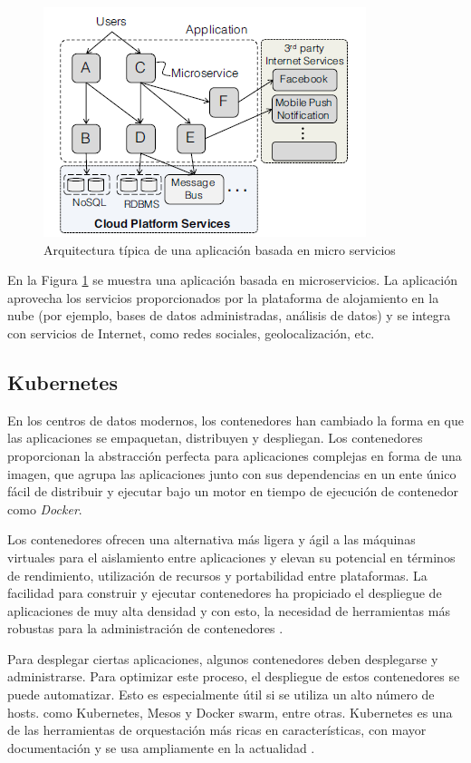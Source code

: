\begin{figure}[htpb!]
	\centering
	\includegraphics[width=0.8\columnwidth]{images/mserv01.png}
	\caption{Arquitectura típica de una aplicación basada en micro servicios \cite{LIB08}}
	\label{fig:mserv01}
\end{figure}

\par En la Figura \ref{fig:mserv01} se muestra una aplicación basada en microservicios. La aplicación aprovecha los servicios proporcionados por la plataforma de alojamiento en la nube (por ejemplo, bases de datos administradas, análisis de datos) y se integra con servicios de Internet, como redes sociales, geolocalización, etc.

\subsection{Kubernetes}
\par En los centros de datos modernos, los contenedores han cambiado la forma en que las aplicaciones se empaquetan, distribuyen y despliegan. Los contenedores proporcionan la abstracción perfecta para aplicaciones complejas en forma de una imagen, que agrupa las aplicaciones junto con sus dependencias en un ente único fácil de distribuir y ejecutar bajo un motor en tiempo de ejecución de contenedor como \textit{Docker}.\\
\par Los contenedores ofrecen una alternativa más ligera y ágil a las máquinas virtuales para el aislamiento entre aplicaciones y elevan su potencial en términos de rendimiento, utilización de recursos y portabilidad entre plataformas. La facilidad para construir y ejecutar contenedores ha propiciado el despliegue de aplicaciones de muy alta densidad y con esto, la necesidad de herramientas más robustas para la administración de contenedores \cite{BOOK04}.\\
\par Para desplegar ciertas aplicaciones, algunos contenedores deben desplegarse y administrarse. Para optimizar este proceso, el despliegue de estos contenedores se puede automatizar. Esto es especialmente útil si se utiliza un alto número de hosts. 
como Kubernetes, Mesos y Docker swarm, entre otras. Kubernetes es una de las herramientas de orquestación más ricas en características, con mayor documentación y se usa ampliamente en la actualidad \cite{BOOK02}.

